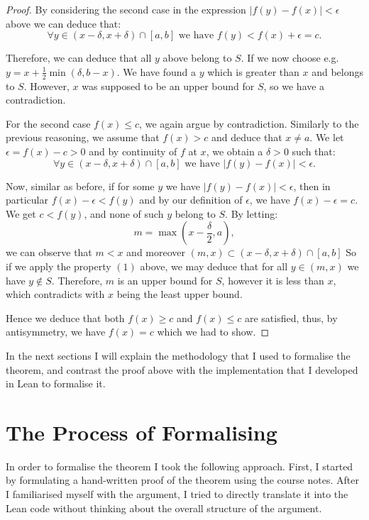 \documentclass[11pt]{article}
\newcommand\weh{\text{ we have }}
\begin{document}
\begin{proof}
By considering the second case in the expression $|f(y) - f(x)| < \epsilon $ above
we can deduce that:
\[
  \forall y \in (x - \delta, x + \delta) \cap [a, b] \weh f(y) < f(x) + \epsilon = c
.\]

Therefore, we can deduce that  all $y$ above belong to $S$.
If we now choose e.g. $y = x + \frac{1}{2} \min(\delta, b - x)$. We have found
a $y$ which is greater than $x$ and belongs to $S$. However,  $x$ was supposed
to be an upper bound for  $S$, so we have a contradiction.

For the second case $f(x) \le c$, we again argue by contradiction. Similarly to
the previous reasoning, we assume that $f(x) > c$ and deduce that  $x \ne a$.
We let  $\epsilon = f(x) - c > 0$ and by continuity of $f$ at $x$, we obtain a
$\delta > 0$ such that:
\begin{equation}
  \forall y \in (x - \delta, x + \delta) \cap [a, b] \weh |f(y) - f(x)| < \epsilon
.\end{equation}

Now, similar as before, if for some $y$ we have  $|f(y) - f(x)| < \epsilon$, then
in particular $f(x) - \epsilon < f(y) $ and by our definition of  $\epsilon$,
we have $f(x) - \epsilon = c $. We get  $c < f(y)$, and none of such
$y$ belong to $S$. By letting:
\[
m = \max \left(x - \frac{\delta}{2}, a\right)
,\]
we can observe that $m < x$ and moreover $(m, x) \subset (x - \delta, x + \delta) \cap [a, b]$
So if we apply the property $(1)$ above, we may deduce that for all $y \in (m, x)$
we have  $y \not\in S$. Therefore, $m$ is an upper bound for $S$, however it is
less than $x$, which contradicts with  $x$ being the least upper bound.

Hence we deduce that both $f(x) \ge c$ and  $f(x) \le c$ are satisfied, thus,
by antisymmetry, we have $f(x) = c$ which we had to show.
\end{proof}

In the next sections I will explain the methodology that I used to
formalise the theorem, and contrast the proof above with the implementation
that I developed in Lean to formalise it.
\section*{ The Process of Formalising }
In order to formalise the theorem I took the following approach. First, I
started by formulating a hand-written proof of the theorem using the course
notes. After I familiarised myself with the argument, I tried to directly
translate it into the Lean code without thinking about the overall structure of
the argument.
\end{document}
